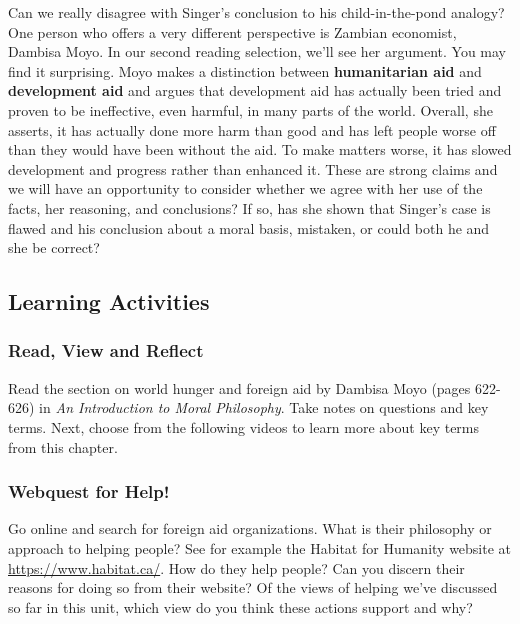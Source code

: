 \documentclass[
]{book}
\begin{document}
Can we really disagree with Singer's conclusion to his child-in-the-pond analogy? One person who offers a very different perspective is Zambian economist, Dambisa Moyo. In our second reading selection, we'll see her argument. You may find it surprising.
Moyo makes a distinction between \textbf{humanitarian aid} and \textbf{development aid} and argues that development aid has actually been tried and proven to be ineffective, even harmful, in many parts of the world. Overall, she asserts, it has actually done more harm than good and has left people worse off than they would have been without the aid. To make matters worse, it has slowed development and progress rather than enhanced it.
These are strong claims and we will have an opportunity to consider whether we agree with her use of the facts, her reasoning, and conclusions? If so, has she shown that Singer's case is flawed and his conclusion about a moral basis, mistaken, or could both he and she be correct?

\hypertarget{learning-activities-24}{%
\subsection*{Learning Activities}\label{learning-activities-24}}

\begin{reflect}
\hypertarget{read-view-and-reflect-33}{%
\subsubsection*{Read, View and Reflect}\label{read-view-and-reflect-33}}

Read the section on world hunger and foreign aid by Dambisa Moyo (pages 622-626) in \emph{An Introduction to Moral Philosophy}. Take notes on questions and key terms.
Next, choose from the following videos to learn more about key terms from this chapter.

\hypertarget{webquest-for-help-1}{%
\subsubsection*{Webquest for Help!}\label{webquest-for-help-1}}

Go online and search for foreign aid organizations. What is their philosophy or approach to helping people? See for example the Habitat for Humanity website at \url{https://www.habitat.ca/}. How do they help people? Can you discern their reasons for doing so from their website? Of the views of helping we've discussed so far in this unit, which view do you think these actions support and why?
\end{reflect}
\end{document}
